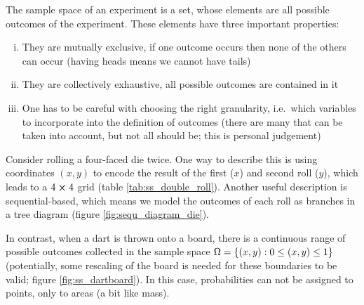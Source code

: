 \begin{defi}
The sample space of an experiment is a set, whose elements are all possible outcomes of the experiment. These elements have three important properties:
\begin{enumerate}[(i)]
\item They are mutually exclusive, if one outcome occurs then none of the others can occur (having heads means we cannot have tails)

\item They are collectively exhaustive, all possible outcomes are contained in it

\item One has to be careful with choosing the right granularity, i.e.~which variables to incorporate into the definition of outcomes (there are many that can be taken into account, but not all should be; this is personal judgement)
\end{enumerate}
\end{defi}



\begin{ex}
Consider rolling a four-faced die twice. One way to describe this is using coordinates $(x, y)$ to encode the result of the first ($x$) and second roll ($y$), which leads to a $4 \cross 4$ grid (table \ref{tab:ss_double_roll}). Another useful description is sequential-based, which means we model the outcomes of each roll as branches in a tree diagram (figure \ref{fig:sequ_diagram_die}).

In contrast, when a dart is thrown onto a board, there is a continuous range of possible outcomes collected in the sample space $\Omega = \qty{(x, y): 0 \leq (x, y) \leq 1}$ (potentially, some rescaling of the board is needed for these boundaries to be valid; figure \ref{fig:ss_dartboard}). In this case, probabilities can not be assigned to points, only to areas (a bit like mass).
\end{ex}



